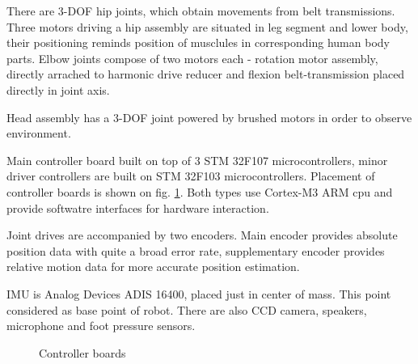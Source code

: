 \documentclass[letterpaper, 10 pt, conference]{ieeeconf}  %
\begin{document}
There are 3-DOF hip joints, which obtain movements from belt transmissions.
Three motors driving a hip assembly are situated in leg segment and lower body,
their positioning reminds position of musclules in corresponding human body
parts.
Elbow joints compose of two motors each - rotation motor assembly, directly
arrached to harmonic drive reducer and flexion belt-transmission placed directly
in joint axis.

Head assembly has a 3-DOF joint powered by brushed motors in order to observe
environment.

Main controller board built on top of 3 STM 32F107 microcontrollers, minor
driver controllers are built on STM 32F103 microcontrollers. Placement of
controller boards is shown on fig. \ref{img:electronics}.  Both types use
Cortex-M3 ARM cpu and provide softwatre interfaces for hardware interaction.

Joint drives are accompanied by two encoders. Main encoder provides absolute
position data with quite a broad error rate, supplementary encoder provides
relative motion data for more accurate position estimation.

IMU is Analog Devices ADIS 16400, placed just in center of mass. This point
considered as base point of robot. There are
also CCD camera, speakers, microphone and foot pressure sensors.

\begin{figure}[thpb]
\caption{Controller boards}
\label{img:electronics}
\end{figure}  
\end{document}
